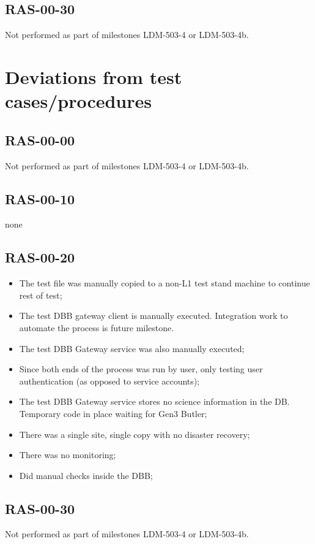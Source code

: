 \documentclass[DM,lsstdraft,STR,toc]{lsstdoc}
\begin{document}
\subsection{RAS-00-30}
\label{sect:detail-RAS-00-30}
Not performed as part of milestones LDM-503-4 or LDM-503-4b.



\section{Deviations from test cases/procedures}

\subsection{RAS-00-00}
Not performed as part of milestones LDM-503-4 or LDM-503-4b.
\subsection{RAS-00-10}
none
\subsection{RAS-00-20}
\begin{itemize}
   \item{
 The test file was manually copied to a non-L1 test stand machine
to continue rest of test;
}
   \item{
 The test DBB gateway client is manually executed.  Integration
work to automate the process is future milestone.  
}
   \item{
 The test DBB Gateway service was also manually executed;
}
   \item{
 Since both ends of the process was run by user, only testing user
authentication (as opposed to service accounts);
}
   \item{
 The test DBB Gateway service stores no science information in the
DB.  Temporary code in place waiting for Gen3 Butler;
}
   \item{
 There was a single site, single copy with no disaster recovery;
}
   \item{
 There was no monitoring;
}
   \item{
 Did manual checks inside the DBB;
}
\end{itemize}
\subsection {RAS-00-30}
Not performed as part of milestones LDM-503-4 or LDM-503-4b.
\end{document}
